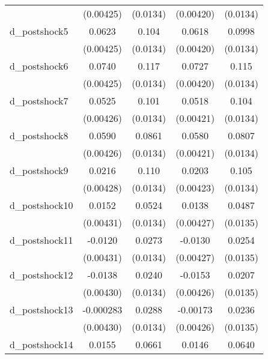 {\begin{tabular}{l*{4}{c}}
          &(0.00425)         & (0.0134)         &(0.00420)         & (0.0134)         \\
d\_postshock5&   0.0623\sym{***}&    0.104\sym{***}&   0.0618\sym{***}&   0.0998\sym{***}\\
          &(0.00425)         & (0.0134)         &(0.00420)         & (0.0134)         \\
d\_postshock6&   0.0740\sym{***}&    0.117\sym{***}&   0.0727\sym{***}&    0.115\sym{***}\\
          &(0.00425)         & (0.0134)         &(0.00420)         & (0.0134)         \\
d\_postshock7&   0.0525\sym{***}&    0.101\sym{***}&   0.0518\sym{***}&    0.104\sym{***}\\
          &(0.00426)         & (0.0134)         &(0.00421)         & (0.0134)         \\
d\_postshock8&   0.0590\sym{***}&   0.0861\sym{***}&   0.0580\sym{***}&   0.0807\sym{***}\\
          &(0.00426)         & (0.0134)         &(0.00421)         & (0.0134)         \\
d\_postshock9&   0.0216\sym{***}&    0.110\sym{***}&   0.0203\sym{***}&    0.105\sym{***}\\
          &(0.00428)         & (0.0134)         &(0.00423)         & (0.0134)         \\
d\_postshock10&   0.0152\sym{***}&   0.0524\sym{***}&   0.0138\sym{**} &   0.0487\sym{***}\\
          &(0.00431)         & (0.0134)         &(0.00427)         & (0.0135)         \\
d\_postshock11&  -0.0120\sym{**} &   0.0273\sym{*}  &  -0.0130\sym{**} &   0.0254         \\
          &(0.00431)         & (0.0134)         &(0.00427)         & (0.0135)         \\
d\_postshock12&  -0.0138\sym{**} &   0.0240         &  -0.0153\sym{***}&   0.0207         \\
          &(0.00430)         & (0.0134)         &(0.00426)         & (0.0135)         \\
d\_postshock13&-0.000283         &   0.0288\sym{*}  & -0.00173         &   0.0236         \\
          &(0.00430)         & (0.0134)         &(0.00426)         & (0.0135)         \\
d\_postshock14&   0.0155\sym{***}&   0.0661\sym{***}&   0.0146\sym{***}&   0.0640\sym{***}\\

\end{tabular}}
